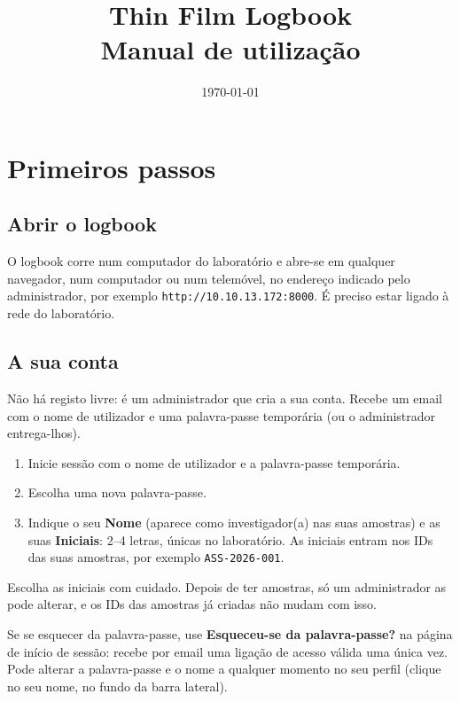 \documentclass[11pt,a4paper]{article}
\title{\color{accent}\textbf{Thin Film Logbook}\\[4pt]\large Manual de utilização}
\author{}
\date{\today}
\newcommand{\ui}[1]{\textsf{\textbf{#1}}}
\newcommand{\sid}[1]{\texttt{#1}}
\begin{document}
\maketitle
\thispagestyle{empty}

\tableofcontents
\newpage

\section{Primeiros passos}

\subsection{Abrir o logbook}

O logbook corre num computador do laboratório e abre-se em qualquer
navegador, num computador ou num telemóvel, no endereço indicado pelo
administrador, por exemplo \texttt{http://10.10.13.172:8000}. É preciso
estar ligado à rede do laboratório.

\subsection{A sua conta}

Não há registo livre: é um administrador que cria a sua conta. Recebe um
email com o nome de utilizador e uma palavra-passe temporária (ou o
administrador entrega-lhos).

\begin{enumerate}
  \item Inicie sessão com o nome de utilizador e a palavra-passe temporária.
  \item Escolha uma nova palavra-passe.
  \item Indique o seu \ui{Nome} (aparece como investigador(a) nas suas
        amostras) e as suas \ui{Iniciais}: 2--4 letras, únicas no
        laboratório. As iniciais entram nos IDs das suas amostras, por
        exemplo \sid{ASS-2026-001}.
\end{enumerate}

\begin{careful}
Escolha as iniciais com cuidado. Depois de ter amostras, só um
administrador as pode alterar, e os IDs das amostras já criadas não mudam com isso.
\end{careful}

Se se esquecer da palavra-passe, use \ui{Esqueceu-se da palavra-passe?} na
página de início de sessão: recebe por email uma ligação de acesso válida
uma única vez. Pode alterar a palavra-passe e o nome a qualquer momento no
seu perfil (clique no seu nome, no fundo da barra lateral).
\end{document}
